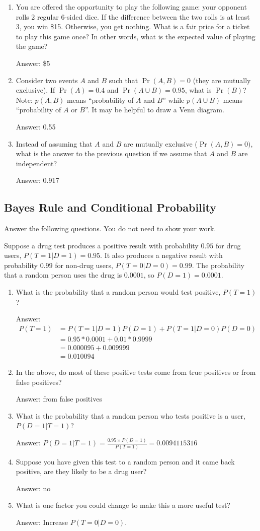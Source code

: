 \documentclass{article}
\def\ans#1{\par\gre{Answer: #1}}
\def\blu#1{{\color{blu}#1}}
\def\gre#1{{\color{gre}#1}}
\begin{document}
\begin{enumerate}
\item You are offered the opportunity to play the following game: your opponent rolls 2 regular 6-sided dice. If the difference between the two rolls is at least 3, you win \$15. Otherwise, you get nothing. What is a fair price for a ticket to play this game once? In other words, what is the expected value of playing the game?
\ans{\$5}
\item Consider two events $A$ and $B$ such that $\Pr(A, B)=0$ (they are mutually exclusive). If $\Pr(A) = 0.4$ and $\Pr(A \cup B) = 0.95$, what is $\Pr(B)$? Note: $p(A, B)$ means
``probability of $A$ and $B$'' while $p(A \cup B)$ means ``probability of $A$ or $B$''. It may be helpful to draw a Venn diagram.
\ans{0.55}
\item Instead of assuming that $A$ and $B$ are mutually exclusive ($\Pr(A,B) = 0)$, what is the answer to the previous question if we assume that $A$ and $B$ are independent?
\ans{0.917}
\end{enumerate}

\subsection{Bayes Rule and Conditional Probability}

\blu{Answer the following questions.} You do not need to show your work.

Suppose a drug test produces a positive result with probability $0.95$ for drug users, $P(T=1|D=1)=0.95$. It also produces a negative result with probability $0.99$ for non-drug users, $P(T=0|D=0)=0.99$. The probability that a random person uses the drug is $0.0001$, so $P(D=1)=0.0001$. 

\begin{enumerate}
\item What is the probability that a random person would test positive, $P(T=1)$?
\ans{\begin{align*}P(T=1) &= P(T=1|D=1)P(D=1) + P(T=1|D=0)P(D=0)\\ &= 0.95*0.0001 + 0.01*0.9999 \\ &= 0.000095 + 0.009999 \\ &= 0.010094 \end{align*}}
\item In the above, do most of these positive tests come from true positives or from false positives? 
\ans{from false positives}
\item What is the probability that a random person who tests positive is a user, $P(D=1|T=1)$?
\ans{$P(D=1|T=1) = \frac{0.95\times P(D=1)}{P(T=1)} = 0.0094115316$}
\item Suppose you have given this test to a random person and it came back positive, are they likely to be a drug user?
\ans{no}
\item What is one factor you could change to make this a more useful test?
\ans{Increase $P(T=0|D=0)$.}
\end{enumerate}
\end{document}
